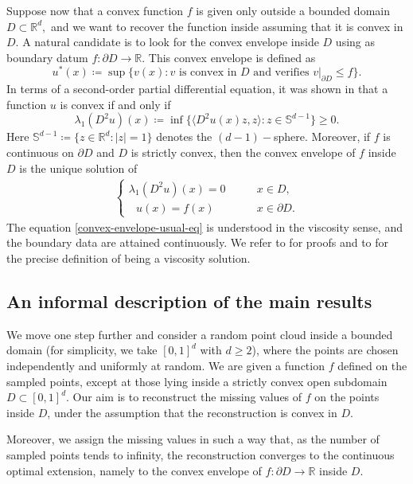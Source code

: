 \documentclass[11pt]{amsart}
\theoremstyle{definition}
\theoremstyle{remark}
\numberwithin{equation}{section}
\begin{document}
	
	Suppose now that a convex function $f$ is given only outside a bounded domain
	$D \subset \mathbb{R}^d,$ and we want to recover the function inside assuming that it is convex in $D$.
	A natural candidate is to look for the convex envelope inside $D$ using as boundary
	datum $f\colon \partial D \to  {\mathbb{R}}$. This convex envelope is defined as
	\begin{equation} \label{convex-envelope-usual}
		u^* (x) \coloneqq \sup \Big\{v(x) \colon v 
		\mbox{ is convex in $D$ and verifies } v|_{\partial D} \leq f \Big\}.
	\end{equation}
	In terms of a second-order partial differential equation, it was shown in \cite{OS,Ober} that a function $u$ is convex if and only if 
	\[
		\lambda_1 (D^2 u) (x)\coloneqq
		\inf \Big\{
			\langle D^2 u(x) z, z \rangle\colon z\in\mathbb{S}^{d-1}
		\Big\} \geq 0.
	\] 
	Here $\mathbb{S}^{d-1}\coloneqq \{z\in \mathbb{R}^d \colon |z|=1\}$ denotes the $(d-1)-$sphere. 
	Moreover, if $f$ is continuous on $\partial D$ and $D$ is strictly convex, then the convex envelope of $f$ inside $D$ is the unique solution of
	\begin{align}\label{convex-envelope-usual-eq}
	\begin{cases}
			\lambda_1 (D^2 u) (x) = 0 \qquad &x\in D, \\
		~~~u(x) = f (x)  \qquad &x\in  \partial D.
		\end{cases}
	\end{align}
		The equation \eqref{convex-envelope-usual-eq} is understood in the viscosity sense, and the boundary data are attained continuously. We refer to \cite{BlancRossi,HL1,OS,Ober} for proofs and to \cite{CIL,Koike} for the precise definition of being a viscosity solution.

	
	\subsection{An informal description of the main results} 
	We move one step further and consider a random point cloud inside a bounded domain 
(for simplicity, we take $[0,1]^d$ with $d\ge 2$), where the points are chosen independently and uniformly at random. 
	We are given a function $f$ defined on the sampled points, except at those lying inside a strictly convex open subdomain $D \subset [0,1]^d$. 
	Our aim is to reconstruct the missing values of $f$ on the points inside $D$, under the assumption that the reconstruction is convex in $D$.
	
Moreover, we assign the missing values in such a way that, as the number of sampled points tends to infinity, the reconstruction converges to the continuous optimal extension, namely to the convex envelope of $f\colon \partial D \to  {\mathbb{R}}$ inside $D$.
		
\end{document}
